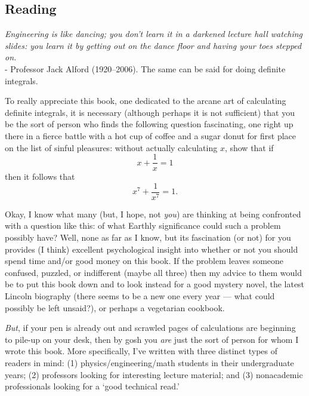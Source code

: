 


\subsection*{Reading}
\begin{center}
  \textit{Engineering is like dancing; you don't learn it in a darkened lecture hall watching slides: you learn it by getting out on the dance floor and having your toes stepped on.}\\- Professor Jack Alford (1920–2006). The same can be said for doing definite integrals.
\end{center}

To really appreciate this book, one dedicated to the arcane art of calculating
definite integrals, it is necessary (although perhaps it is not sufficient) that you be
the sort of person who finds the following question fascinating, one right up there in
a fierce battle with a hot cup of coffee and a sugar donut for first place on the list of
sinful pleasures: without actually calculating $ x $, show that if
\begin{displaymath}
  x + \frac{1}{x} = 1
\end{displaymath}
then it follows that
\begin{displaymath}
  x^7 + \frac{1}{x^7} = 1.
\end{displaymath}

Okay, I know what many (but, I hope, not \textit{you}) are thinking at being confronted
with a question like this: of what Earthly significance could such a problem possibly
have? Well, none as far as I know, but its fascination (or not) for
you provides (I think) excellent psychological insight into whether or not
you should spend time and/or good money on this book. If the problem leaves someone confused, puzzled,
or indifferent (maybe all three) then my advice to them would be to put this book
down and to look instead for a good mystery novel, the latest Lincoln biography
(there seems to be a new one every year --- what could
possibly be left unsaid?), or perhaps a vegetarian cookbook.

\textit{But}, if your pen is already out and scrawled pages of calculations are beginning
to pile-up on your desk, then by gosh you \textit{are} just the sort of person for whom I
wrote this book. More specifically, I've written with three distinct types of
readers in mind: (1) physics/engineering/math students in their undergraduate
years; (2) professors looking for interesting lecture material; and (3) nonacademic
professionals looking for a `good technical read.'

